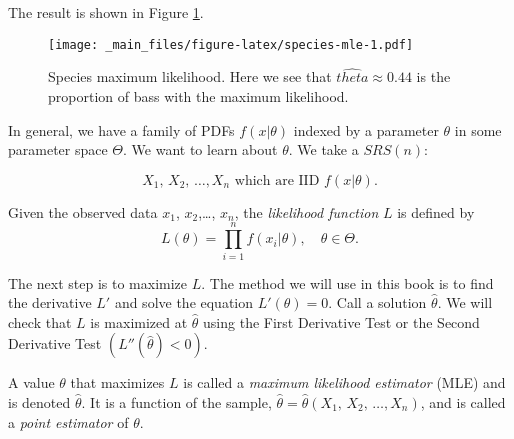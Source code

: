 \documentclass[]{book}
\numberwithin{equation}{chapter}
\numberwithin{figure}{chapter}
\theoremstyle{plain}
\theoremstyle{definition}
\theoremstyle{remark}
\theoremstyle{definition}
\theoremstyle{definition}
\theoremstyle{remark}
\let\BeginKnitrBlock\begin \let\EndKnitrBlock\end
\begin{document}
The result is shown in Figure \ref{fig:species-mle}.

\begin{figure}[htbp]
\centering
\texttt{[image: \_main\_files/figure-latex/species-mle-1.pdf]}
\caption{\label{fig:species-mle}\small Species maximum likelihood. Here we see
that \(\hat{theta} \approx 0.44\) is the proportion of bass with the
maximum likelihood.}
\end{figure}





In general, we have a family of PDFs \(f(x|\theta)\) indexed by a
parameter \(\theta\) in some parameter space \(\Theta\). We want to
learn about \(\theta\). We take a \(SRS(n)\):

\begin{equation}
X_{1},\, X_{2},\,\ldots,X_{n}\mbox{ which are IID \(f(x| \theta )\).}
\end{equation}

\bigskip

\BeginKnitrBlock{definition}
\protect\hypertarget{def:unnamed-chunk-340}{}{\label{def:unnamed-chunk-340}}Given
the observed data \(x_{1}\), \(x_{2}\),\ldots{}, \(x_{n}\), the
\emph{likelihood function} \(L\) is defined by \[
L(\theta)=\prod_{i=1}^{n}f(x_{i}|\theta),\quad \theta\in\Theta.  \]
\EndKnitrBlock{definition}

The next step is to maximize \(L\). The method we will use in this book
is to find the derivative \(L'\) and solve the equation
\(L'(\theta)=0\). Call a solution \(\hat{\theta}\). We will check that
\(L\) is maximized at \(\hat{\theta}\) using the First Derivative Test
or the Second Derivative Test \(\left(L''(\hat{\theta})<0\right)\).

\bigskip

\BeginKnitrBlock{definition}
\protect\hypertarget{def:unnamed-chunk-341}{}{\label{def:unnamed-chunk-341}}A
value \(\theta\) that maximizes \(L\) is called a \emph{maximum
likelihood estimator} (MLE) and is denoted \(\hat{\theta}\). It is a
function of the sample,
\(\hat{\theta}=\hat{\theta}\left(X_{1},\, X_{2},\,\ldots,X_{n}\right)\),
and is called a \emph{point estimator} of \(\theta\).
\EndKnitrBlock{definition}

\bigskip
\end{document}
